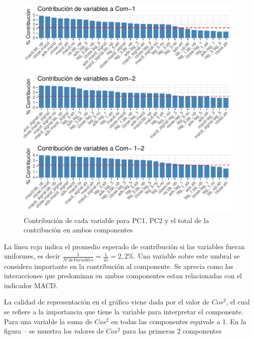 \documentclass[a4paper,12pt]{Latex/Classes/PhDthesisPSnPDF}
\begin{document}
\begin{figure}[H]
\centering
\includegraphics{main-014}
\caption{Contribución de cada variable para PC1, PC2 y el total de la contribución en ambos componentes}
\end{figure}

La línea roja indica el promedio esperado de contribución si las variables fueran uniformes, es decir $ \frac{1}{N° de Variables} = \frac{1}{45} = 2,2\%$. Una variable sobre este umbral se considera importante en la contribución al componente. Se aprecia como las interacciones que predominan en ambos componentes estan relacionadas con el indicador MACD.

La calidad de representación en el gráfico viene dada por el valor de $Cos^2$, el cual se refiere a la importancia que tiene la variable para interpretar el componente. Para una variable la suma de $Cos^2$ en todas las componentes equivale a 1. En la figura -- se muestra los valores de $Cos^2$ para las primeras 2 componentes
\end{document}
